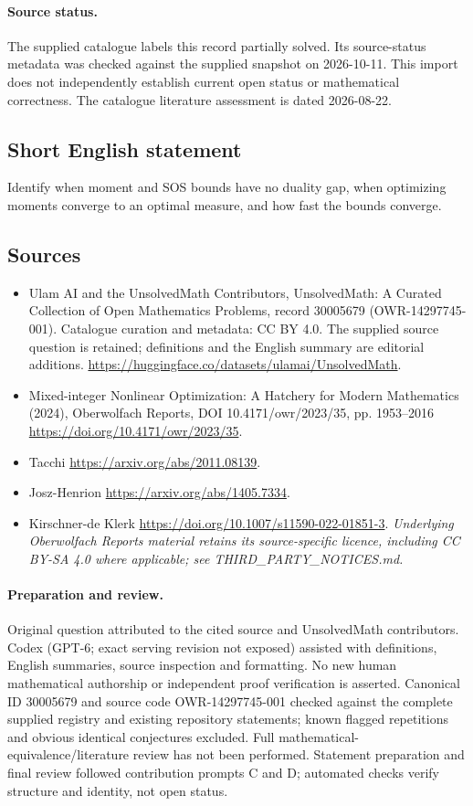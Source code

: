 \documentclass[11pt]{article}
\begin{document}
\paragraph{Source status.}
The supplied catalogue labels this record partially solved. Its source-status metadata was checked against the supplied snapshot on 2026-10-11. This import does not independently establish current open status or mathematical correctness. The catalogue literature assessment is dated 2026-08-22.
\subsection{Short English statement}
Identify when moment and SOS bounds have no duality gap, when optimizing moments converge to an optimal measure, and how fast the bounds converge.
\subsection{Sources}
\begin{itemize}
\item[\hypertarget{source:30005679:1}{S1}] Ulam AI and the UnsolvedMath Contributors, UnsolvedMath: A Curated Collection of Open Mathematics Problems, record 30005679 (OWR-14297745-001). Catalogue curation and metadata: CC BY 4.0. The supplied source question is retained; definitions and the English summary are editorial additions.
\url{https://huggingface.co/datasets/ulamai/UnsolvedMath}.
\item[\hypertarget{source:30005679:2}{S2}] Mixed-integer Nonlinear Optimization: A Hatchery for Modern Mathematics (2024), Oberwolfach Reports, DOI 10.4171/owr/2023/35, pp. 1953--2016
\url{https://doi.org/10.4171/owr/2023/35}.
\item[\hypertarget{source:30005679:3}{S3}] Tacchi
\url{https://arxiv.org/abs/2011.08139}.
\item[\hypertarget{source:30005679:4}{S4}] Josz-Henrion
\url{https://arxiv.org/abs/1405.7334}.
\item[\hypertarget{source:30005679:5}{S5}] Kirschner-de Klerk
\url{https://doi.org/10.1007/s11590-022-01851-3}.
\textit{Underlying Oberwolfach Reports material retains its source-specific licence, including CC BY-SA 4.0 where applicable; see THIRD\_PARTY\_NOTICES.md.}
\end{itemize}
\paragraph{Preparation and review.}
Original question attributed to the cited source and UnsolvedMath contributors. Codex (GPT-6; exact serving revision not exposed) assisted with definitions, English summaries, source inspection and formatting. No new human mathematical authorship or independent proof verification is asserted. Canonical ID 30005679 and source code OWR-14297745-001 checked against the complete supplied registry and existing repository statements; known flagged repetitions and obvious identical conjectures excluded. Full mathematical-equivalence/literature review has not been performed. Statement preparation and final review followed contribution prompts C and D; automated checks verify structure and identity, not open status.
\label{end:30005679}
\end{document}
